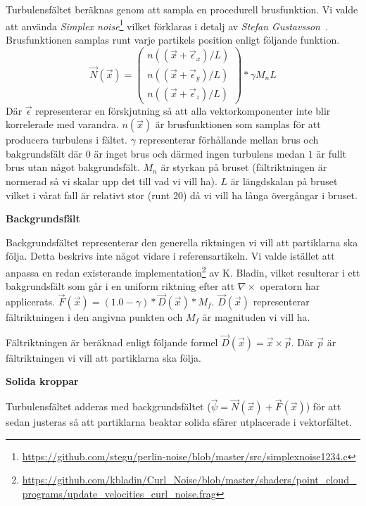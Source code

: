 \documentclass[a4paper]{article}
\begin{document}
\begin{multicols}{2}
    Turbulensfältet beräknas genom att sampla en procedurell brusfunktion. Vi valde att använda \textit{Simplex noise}\footnote{\url{https://github.com/stegu/perlin-noise/blob/master/src/simplexnoise1234.c}} vilket förklaras i detalj av \emph{Stefan Gustavsson}~\cite{gustavson2005simplex}. Brusfunktionen samplas runt varje partikels position enligt följande funktion.
    \begin{equation}
   \vec{N}(\vec{x}) =
        \begin{pmatrix}
        n((\vec{x} + \vec{\epsilon}_x)/L)
        \\
        n((\vec{x} + \vec{\epsilon}_y)/L)
        \\ 
        n((\vec{x} + \vec{\epsilon}_z)/L)
        \end{pmatrix} * \gamma M_nL
    \end{equation}
    Där $\vec{\epsilon}$ representerar en förskjutning så att alla vektorkomponenter inte blir korrelerade med varandra. $n(\vec{x})$ är brusfunktionen som samplas för att producera turbulens i fältet. $\gamma$ representerar förhållande mellan brus och bakgrundsfält där $0$ är inget brus och därmed ingen turbulens medan $1$ är fullt brus utan något bakgrundsfält. $M_n$ är styrkan på bruset (fältriktningen är normerad så vi skalar upp det till vad vi vill ha). $L$ är längdskalan på bruset vilket i vårat fall är relativt stor (runt 20) då vi vill ha långa övergångar i bruset.

\textbf{Backgrundsfält}

Backgrundsfältet representerar den generella riktningen vi vill att partiklarna ska följa. Detta beskrivs inte något vidare i referensartikeln. Vi valde istället att anpassa en redan existerande implementation\footnote{\url{https://github.com/kbladin/Curl_Noise/blob/master/shaders/point_cloud_programs/update_velocities_curl_noise.frag}} av K. Bladin, vilket resulterar i ett bakgrundsfält som går i en uniform riktning efter att $\nabla \times$ operatorn har applicerats.
$     \vec{F}(\vec{x}) = (1.0-\gamma) *  \vec{D}(\vec{x}) * M_f $. $ \vec{D}(\vec{x})$ representerar fältriktningen i den angivna punkten och $M_f$ är magnituden vi vill ha. 

Fältriktningen är beräknad enligt följande formel $\vec{D}(\vec{x}) = \vec{x} \times \vec{p}$. Där $\vec{p}$ är fältriktningen vi vill att partiklarna ska följa.

\textbf{Solida kroppar}

Turbulensfältet adderas med backgrundsfältet ($\vec{\psi} = \vec{N}(\vec{x}) + \vec{F}(\vec{x})$) för att sedan justeras så att partiklarna beaktar solida sfärer utplacerade i vektorfältet. 


\end{multicols}
\end{document}
